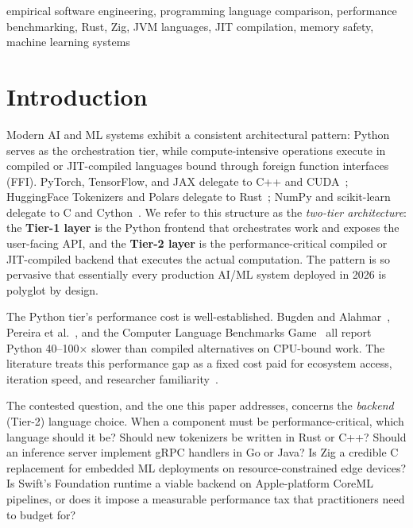 \documentclass[10pt,conference]{IEEEtran}
\begin{document}
\begin{IEEEkeywords}
empirical software engineering, programming language comparison,
performance benchmarking, Rust, Zig, JVM languages,
JIT compilation, memory safety, machine learning systems
\end{IEEEkeywords}

\section{Introduction}
\label{sec:intro}

Modern AI and ML systems exhibit a consistent architectural pattern:
Python serves as the orchestration tier, while compute-intensive
operations execute in compiled or JIT-compiled languages bound through
foreign function interfaces (FFI). PyTorch, TensorFlow, and JAX delegate
to C++ and CUDA~\cite{paszke2019pytorch,abadi2016tensorflow,jax2018github};
HuggingFace Tokenizers and Polars delegate to
Rust~\cite{huggingface-tokenizers,polars}; NumPy and scikit-learn delegate
to C and Cython~\cite{harris2020numpy,pedregosa2011scikit}. We refer
to this structure as the \emph{two-tier architecture}: the
\textbf{Tier-1 layer} is the Python frontend that orchestrates work
and exposes the user-facing API, and the \textbf{Tier-2 layer} is
the performance-critical compiled or JIT-compiled backend that
executes the actual computation. The pattern is so pervasive that
essentially every production AI/ML system deployed in 2026 is
polyglot by design.

The Python tier's performance cost is well-established. Bugden and
Alahmar~\cite{bugden2022igscong}, Pereira et
al.~\cite{pereira2017energy}, and the Computer Language Benchmarks
Game~\cite{clbg} all report Python 40--100$\times$ slower than compiled
alternatives on CPU-bound work. The literature treats this performance
gap as a fixed cost paid for ecosystem access, iteration speed, and
researcher familiarity~\cite{prechelt2000empirical}.

The contested question, and the one this paper addresses, concerns the
\emph{backend} (Tier-2) language choice. When a component must be
performance-critical, which language should it be? Should new
tokenizers be written in Rust or C++? Should an inference server
implement gRPC handlers in Go or Java? Is Zig a credible C replacement
for embedded ML deployments on resource-constrained edge devices? Is
Swift's Foundation runtime a viable backend on Apple-platform CoreML
pipelines, or does it impose a measurable performance tax that
practitioners need to budget for?
\end{document}
